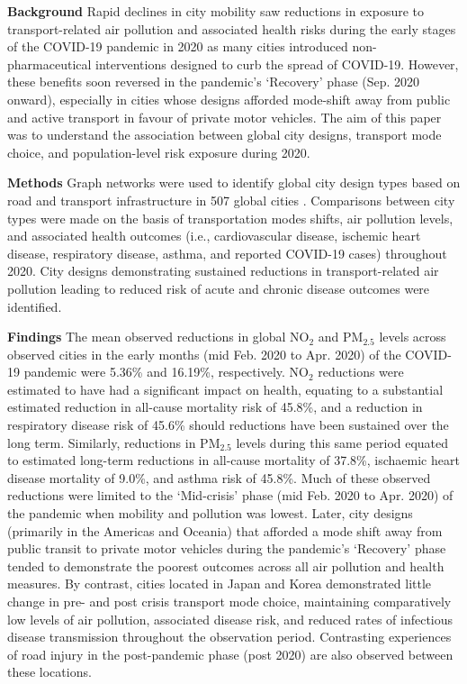 \documentclass[preprint,10pt]{elsarticle} %
\newcommand{\absdiv}[1]{%
  \par\addvspace{.5\baselineskip}%
  \noindent\textbf{#1}\quad\ignorespaces}
\begin{document}


 \absdiv{\textcolor{OliveGreen}{Background}}
Rapid declines in city mobility saw reductions in exposure to transport-related air pollution and associated health risks during the early stages of the COVID-19 pandemic in 2020 as many cities introduced non-pharmaceutical interventions designed to curb the spread of COVID-19. However, these benefits soon reversed in the pandemic's `Recovery' phase (Sep. 2020 onward), especially in cities whose designs afforded mode-shift away from public and active transport in favour of private motor vehicles. The aim of this paper was to understand the association between global city designs, transport mode choice, and population-level risk exposure during 2020.
 \absdiv{\textcolor{OliveGreen}{Methods}}
Graph networks were used to identify global city design types based on road and transport infrastructure in 507 global cities . Comparisons between city types were made on the basis of transportation modes shifts, air pollution levels, and associated health outcomes (i.e., cardiovascular disease, ischemic heart disease, respiratory disease, asthma, and reported COVID-19 cases) throughout 2020. City designs demonstrating sustained reductions in transport-related air pollution leading to reduced risk of acute and chronic disease outcomes were identified.
 \absdiv{\textcolor{OliveGreen}{Findings}}
The mean observed reductions in global NO$_{2}$ and PM$_{2.5}$ levels across observed cities in the early months (mid Feb. 2020 to Apr. 2020) of the COVID-19 pandemic were 5.36\% and 16.19\%, respectively. NO$_{2}$ reductions were estimated to have had a significant impact on health, equating to a substantial estimated reduction in all-cause mortality risk of 45.8\%, and a reduction in respiratory disease risk of 45.6\% should reductions have been sustained over the long term. Similarly, reductions in PM$_{2.5}$ levels during this same period equated to estimated long-term reductions in all-cause mortality of 37.8\%, ischaemic heart disease mortality of 9.0\%, and asthma risk of 45.8\%. Much of these observed reductions were limited to the `Mid-crisis' phase (mid Feb. 2020 to Apr. 2020) of the pandemic when mobility and pollution was lowest. Later, city designs (primarily in the Americas and Oceania) that afforded a mode shift away from public transit to private motor vehicles during the pandemic's `Recovery' phase tended to demonstrate the poorest outcomes across all air pollution and health measures. By contrast, cities located in Japan and Korea demonstrated little change in pre- and post crisis transport mode choice, maintaining comparatively low levels of air pollution, associated disease risk, and reduced rates of infectious disease transmission throughout the observation period. Contrasting experiences of road injury in the post-pandemic phase (post 2020) are also observed between these locations. 
\end{document}
